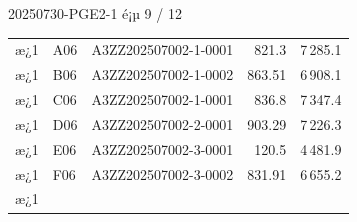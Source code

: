 \documentclass[UTF8,10pt,a4paper,fontset=fandol]{ctexart}
\newcommand{\fieldvalue}[1]{#1}
\begin{document}
\newpage

\noindent
\fieldvalue{20250730-PGE2-1}
\hfill
é¡µ 9 / 12

\bigskip

\begin{tabularx}{\textwidth}{@{}l l X r r@{}}
æ¿1 &
\fieldvalue{A06} &
\fieldvalue{A3ZZ202507002-1-0001} &
\fieldvalue{821.3} &
\fieldvalue{7\,285.1}
\\
æ¿1 &
\fieldvalue{B06} &
\fieldvalue{A3ZZ202507002-1-0002} &
\fieldvalue{863.51} &
\fieldvalue{6\,908.1}
\\
æ¿1 &
\fieldvalue{C06} &
\fieldvalue{A3ZZ202507002-1-0001} &
\fieldvalue{836.8} &
\fieldvalue{7\,347.4}
\\
æ¿1 &
\fieldvalue{D06} &
\fieldvalue{A3ZZ202507002-2-0001} &
\fieldvalue{903.29} &
\fieldvalue{7\,226.3}
\\
æ¿1 &
\fieldvalue{E06} &
\fieldvalue{A3ZZ202507002-3-0001} &
\fieldvalue{120.5} &
\fieldvalue{4\,481.9}
\\
æ¿1 &
\fieldvalue{F06} &
\fieldvalue{A3ZZ202507002-3-0002} &
\fieldvalue{831.91} &
\fieldvalue{6\,655.2}
\\
æ¿1 &

\end{tabularx}
\end{document}
